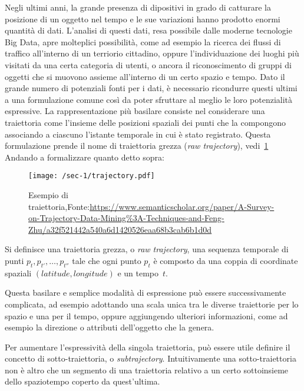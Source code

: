 Negli ultimi anni, la grande presenza di dipositivi in grado di catturare la posizione di un oggetto nel
tempo e le sue variazioni hanno prodotto enormi quantità di dati.
L'analisi di questi dati, resa possibile dalle moderne tecnologie Big Data, apre molteplici possibilità, come
ad esempio la ricerca dei flussi di traffico all'interno di un terriorio cittadino, oppure l'individuazione
dei luoghi più visitati da una certa categoria di utenti, o ancora il riconoscimento di gruppi di oggetti che si
muovono assieme all'interno di un certo spazio e tempo.
Dato il grande numero di potenziali fonti per i dati, è necessario ricondurre questi ultimi a una formulazione comune
così da poter sfruttare al meglio le loro potenzialità espressive.
La rappresentazione più basilare consiste nel considerare una traiettoria come l'insieme delle posizioni
spaziali dei punti che la compongono associando a ciascuno l'istante temporale in cui è stato registrato.
Questa formulazione prende il nome di traiettoria grezza (\textit{raw trajectory}), vedi~\cref{fig:chap-1:trajectory}
Andando a formalizzare quanto detto sopra:

\begin{figure}
  \centering
  \texttt{[image: /sec-1/trajectory.pdf]}
  \caption{Esempio di traiettoria,Fonte:\url{https://www.semanticscholar.org/paper/A-Survey-on-Trajectory-Data-Mining\%3A-Techniques-and-Feng-Zhu/a32f521442a540a6d1420526eaa68b3cab6b1d0d}}%
  \label{fig:chap-1:trajectory}
\end{figure}

\begin{definition}[Traiettoria]

  Si definisce una traiettoria grezza, o \textit{raw trajectory}, una sequenza temporale di punti \({p_{t}, p_{t'},\ldots, p_{t''}}\)
  tale che ogni punto \(p_{t}\) è composto da una coppia di coordinate spaziali \((latitude, longitude)\) e un tempo~\(t\).

\end{definition}

Questa basilare e semplice modalità di espressione può essere successivamente complicata, ad esempio adottando
una scala unica tra le diverse traiettorie per lo spazio e una per il tempo, oppure aggiungendo ulteriori informazioni, come ad esempio la direzione o attributi
dell'oggetto che la genera.

Per aumentare l'espressività della singola traiettoria, può essere utile definire il concetto di sotto-traiettoria, o \textit{subtrajectory}.
Intuitivamente una sotto-traiettoria non è altro che un segmento di una traiettoria relativo a un certo sottoinsieme dello spaziotempo coperto da quest'ultima.

